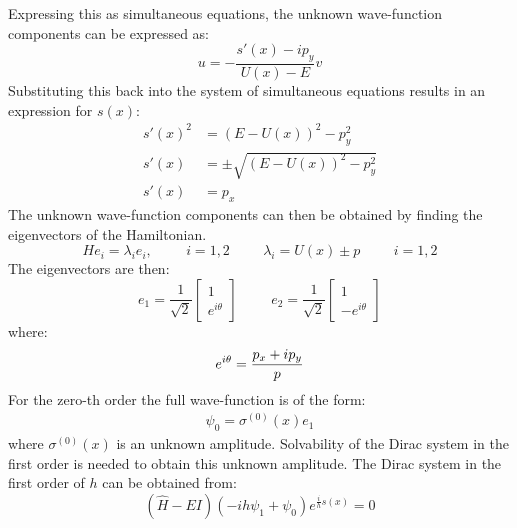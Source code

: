 			Expressing this as simultaneous equations, the unknown wave-function components can be expressed as:
			\begin{equation}
				u=-\frac{s'\left(x\right)-ip_{y}}{U\left(x\right)-E}v
			\end{equation}
			Substituting this back into the system of simultaneous equations results in an expression for $s\left(x\right)$:
			\begin{align}
				s'\left(x\right)^{2}&=\left(E-U\left(x\right)\right)^{2}-p_{y}^{2}\\
				s'\left(x\right)&=\pm\sqrt{\left(E-U\left(x\right)\right)^{2}-p_{y}^{2}}\\
				s'\left(x\right)&=p_{x}
			\end{align}
			The unknown wave-function components can then be obtained by finding the eigenvectors of the Hamiltonian.
			\begin{equation}
			He_{i}=\lambda_{i}e_{i},\hspace{1cm}i=1,2\hspace{1cm}\lambda_{i}=U\left(x\right)\pm p\hspace{1cm}i=1,2
			\end{equation}
			The eigenvectors are then:
			\begin{equation}
				e_{1}=\frac{1}{\sqrt{2}}\left[\begin{array}{cc}
					1\\
				e^{i\theta}
				\end{array}\right]
				\hspace{1cm}
				e_{2}=\frac{1}{\sqrt{2}}\left[\begin{array}{cc}
					1\\
					-e^{i\theta}
				\end{array}\right]
			\end{equation}
			where:
			\begin{equation}
				e^{i\theta}=\frac{p_{x}+ip_{y}}{p}\\
			\end{equation}
			For the zero-th order the full wave-function is of the form:
			\begin{gather}
				\psi_{0}=\sigma^{\left(0\right)}\left(x\right)e_{1}
			\end{gather}
			where $\sigma^{\left(0\right)}\left(x\right)$ is an unknown amplitude. Solvability of the Dirac system in the first order is needed to obtain this unknown amplitude. The Dirac system in the first order of $h$ can be obtained from:
			\begin{equation}
				\left(\hat{H}-EI\right)\left(-ih\psi_{1}+\psi_{0}\right) e^{\frac{i}{h}s\left(x\right)}=0
			\end{equation}
